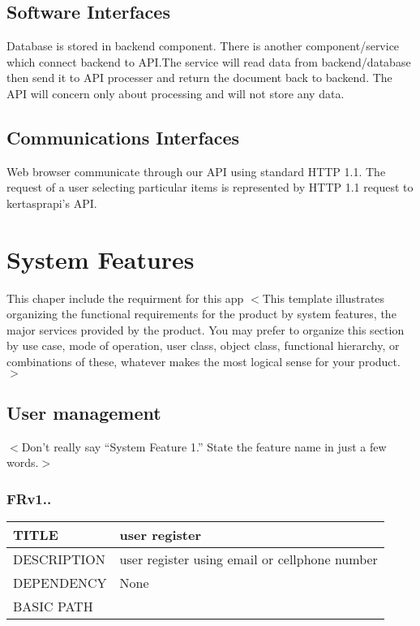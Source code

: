 \documentclass{scrreprt}
\begin{document}
\section{Software Interfaces}
Database is stored in backend component. There is another component/service which connect backend to API.The service will read data from backend/database then send it to API processer and return the document back to backend. The API will concern only about processing and will not store any data.   

\section{Communications Interfaces}
Web browser communicate through our API using standard HTTP 1.1. The request of a user selecting particular items is represented by HTTP 1.1 request to kertasprapi's API. 

\chapter{System Features}
This chaper include the requirment for this app
$<$This template illustrates organizing the functional requirements for the 
product by system features, the major services provided by the product. You may 
prefer to organize this section by use case, mode of operation, user class, 
object class, functional hierarchy, or combinations of these, whatever makes the 
most logical sense for your product.$>$

\section{User management}
$<$Don’t really say “System Feature 1.” State the feature name in just a few 
words.$>$

\subsection{FRv1..}
\label{login}
\begin{table}[]
    \centering
    \begin{tabular}{|l|l|}
        \hline
         TITLE& user register\\ \hline
         DESCRIPTION& user register using email or cellphone number   \\ \hline
         DEPENDENCY& None \\ \hline
         BASIC PATH&  \\ \hline
    \end{tabular}
\end{table}
\end{document}
